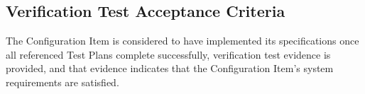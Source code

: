\subsection{Verification Test Acceptance Criteria}
The Configuration Item is considered to have implemented its specifications
once all referenced Test Plans complete successfully, verification test
evidence is provided, and that evidence indicates that the Configuration Item's
system requirements are satisfied.
